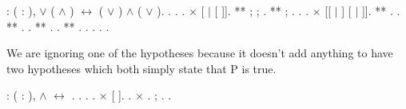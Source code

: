 \begin{coqdoccode}
\coqdocemptyline
\coqdocnoindent
{}  : \coqdockw{\ensuremath{\forall}} (   : ),  \ensuremath{\lor}  ( \ensuremath{\land} ) \ensuremath{\leftrightarrow} ( \ensuremath{\lor} ) \ensuremath{\land} ( \ensuremath{\lor} ).\coqdoceol
\coqdocnoindent
{}.\coqdoceol
\coqdocindent{1.00em}
   . .\coqdoceol
\coqdocindent{1.00em}
\ensuremath{\times}  [ \ensuremath{|} [ ]].\coqdoceol
\coqdocindent{2.00em}
** ; ;  .\coqdoceol
\coqdocindent{2.00em}
** ; .  .  .\coqdoceol
\coqdocindent{1.00em}
\ensuremath{\times}  [[ \ensuremath{|} ] [ \ensuremath{|} ]].\coqdoceol
\coqdocindent{2.00em}
** .  .\coqdoceol
\coqdocindent{2.00em}
** .  .\coqdoceol
\coqdocindent{2.00em}
** .  .\coqdoceol
\coqdocindent{2.00em}
** . .  .  .\coqdoceol
\coqdocnoindent
{}.\coqdoceol
\coqdocemptyline
\end{coqdoccode}
We are ignoring one of the hypotheses because it doesn't add anything to have two hypotheses which both simply state that P is true.

\begin{coqdoccode}
\coqdocemptyline
\coqdocnoindent
{}  : \coqdockw{\ensuremath{\forall}} ( : ),  \ensuremath{\land}  \ensuremath{\leftrightarrow} .\coqdoceol
\coqdocnoindent
{}.\coqdoceol
\coqdocindent{1.00em}
 . .\coqdoceol
\coqdocindent{1.00em}
\ensuremath{\times}  [ \coqdocvar{\_}].\coqdoceol
\coqdocindent{2.00em}
 .\coqdoceol
\coqdocindent{1.00em}
\ensuremath{\times}  . ;  .\coqdoceol
\coqdocnoindent
{}.\coqdoceol
\end{coqdoccode}
